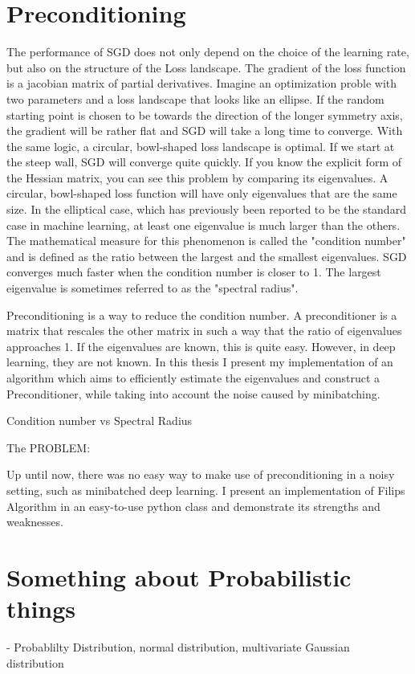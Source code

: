 \documentclass[twoside,12pt,a4paper]{report}
\begin{document}
\section{Preconditioning}
The performance of SGD does not only depend on the choice of the learning rate, but also on the structure of the Loss landscape. The gradient of the loss function is a jacobian matrix of partial derivatives. Imagine an optimization proble with two parameters and a loss landscape that looks like an ellipse. If the random starting point is chosen to be towards the direction of the longer symmetry axis, the gradient will be rather flat and SGD will take a long time to converge. With the same logic, a circular, bowl-shaped loss landscape is optimal.
If we start at the steep wall, SGD will converge quite quickly. If you know the explicit form of the Hessian matrix, you can see this problem by comparing its eigenvalues. A circular, bowl-shaped loss function will have only eigenvalues that are the same size. In the elliptical case, which has previously been reported to be the standard case in machine learning, at least one eigenvalue is much larger than the others.
The mathematical measure for this phenomenon is called the "condition number" and is defined as the ratio between the largest and the smallest eigenvalues. SGD converges much faster when the condition number is closer to 1. The largest eigenvalue is sometimes referred to as the "spectral radius".

Preconditioning is a way to reduce the condition number. A preconditioner is a matrix that rescales the other matrix in such a way that the ratio of eigenvalues approaches 1.
If the eigenvalues are known, this is quite easy. However, in deep learning, they are not known. In this thesis I present my implementation of an algorithm which aims to efficiently estimate the eigenvalues and construct a Preconditioner, while taking into account the noise caused by minibatching.

Condition number vs Spectral Radius

The PROBLEM:

Up until now, there was no easy way to make use of preconditioning in a noisy setting, such as minibatched deep learning. I present an implementation of Filips Algorithm in an easy-to-use python class and demonstrate its strengths and weaknesses.

\section{Something about Probabilistic things}
- Probablilty Distribution, normal distribution, multivariate Gaussian distribution
\end{document}
